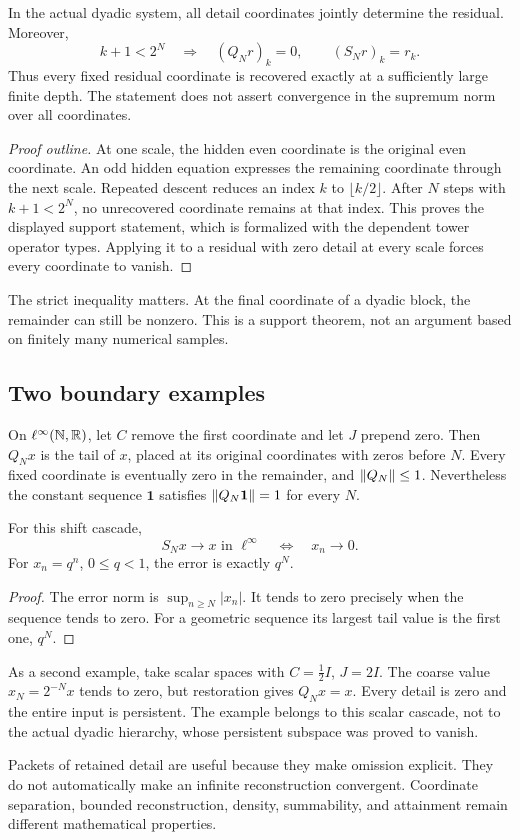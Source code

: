 \begin{theorem}\label{KS28}
In the actual dyadic system, all detail coordinates jointly determine the residual. Moreover,
\[
 k+1<2^N\quad\Longrightarrow\quad
 (Q_Nr)_k=0,\qquad(S_Nr)_k=r_k.
\]
Thus every fixed residual coordinate is recovered exactly at a sufficiently large finite depth. The statement does not assert convergence in the supremum norm over all coordinates.
\end{theorem}
\begin{proof}[Proof outline]
At one scale, the hidden even coordinate is the original even coordinate. An odd hidden equation expresses the remaining coordinate through the next scale. Repeated descent reduces an index \(k\) to \(\lfloor k/2\rfloor\). After \(N\) steps with \(k+1<2^N\), no unrecovered coordinate remains at that index. This proves the displayed support statement, which is formalized with the dependent tower operator types. Applying it to a residual with zero detail at every scale forces every coordinate to vanish.
\end{proof}
The strict inequality matters. At the final coordinate of a dyadic block, the remainder can still be nonzero. This is a support theorem, not an argument based on finitely many numerical samples.

\subsection{Two boundary examples}
On \(\ell^\infty(\mathbb N,\mathbb R)\), let \(C\) remove the first coordinate and let \(J\) prepend zero. Then \(Q_Nx\) is the tail of \(x\), placed at its original coordinates with zeros before \(N\). Every fixed coordinate is eventually zero in the remainder, and \(\left\lVert Q_N\right\rVert\le1\). Nevertheless the constant sequence \(\mathbf1\) satisfies \(\left\lVert Q_N\mathbf1\right\rVert=1\) for every \(N\).

\begin{proposition}\label{KS29}
For this shift cascade,
\[
 S_Nx\to x\text{ in }\ell^\infty
 \quad\Longleftrightarrow\quad x_n\to0.
\]
For \(x_n=q^n\), \(0\le q<1\), the error is exactly \(q^N\).
\end{proposition}
\begin{proof}
The error norm is \(\sup_{n\ge N}|x_n|\). It tends to zero precisely when the sequence tends to zero. For a geometric sequence its largest tail value is the first one, \(q^N\).
\end{proof}
As a second example, take scalar spaces with \(C=\tfrac12I\), \(J=2I\). The coarse value \(x_N=2^{-N}x\) tends to zero, but restoration gives \(Q_Nx=x\). Every detail is zero and the entire input is persistent. The example belongs to this scalar cascade, not to the actual dyadic hierarchy, whose persistent subspace was proved to vanish.

\begin{insight}
Packets of retained detail are useful because they make omission explicit. They do not automatically make an infinite reconstruction convergent. Coordinate separation, bounded reconstruction, density, summability, and attainment remain different mathematical properties.
\end{insight}
